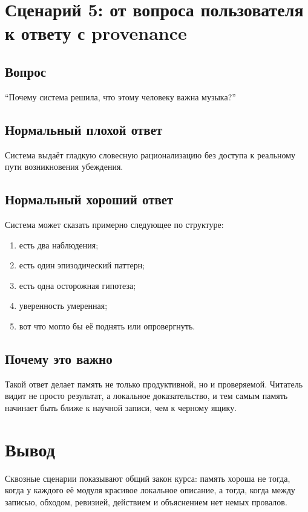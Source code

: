 \section{Сценарий 5: от вопроса пользователя к ответу с provenance}

\subsection*{Вопрос}
``Почему система решила, что этому человеку важна музыка?''

\subsection*{Нормальный плохой ответ}
Система выдаёт гладкую словесную рационализацию без доступа к реальному пути
возникновения убеждения.

\subsection*{Нормальный хороший ответ}
Система может сказать примерно следующее по структуре:
\begin{enumerate}
\item есть два наблюдения;
\item есть один эпизодический паттерн;
\item есть одна осторожная гипотеза;
\item уверенность умеренная;
\item вот что могло бы её поднять или опровергнуть.
\end{enumerate}

\subsection*{Почему это важно}
Такой ответ делает память не только продуктивной, но и проверяемой. Читатель видит
не просто результат, а локальное доказательство, и тем самым память начинает быть
ближе к научной записи, чем к черному ящику.

\section{Вывод}

Сквозные сценарии показывают общий закон курса: память хороша не тогда, когда у
каждого её модуля красивое локальное описание, а тогда, когда между записью,
обходом, ревизией, действием и объяснением нет немых провалов.
